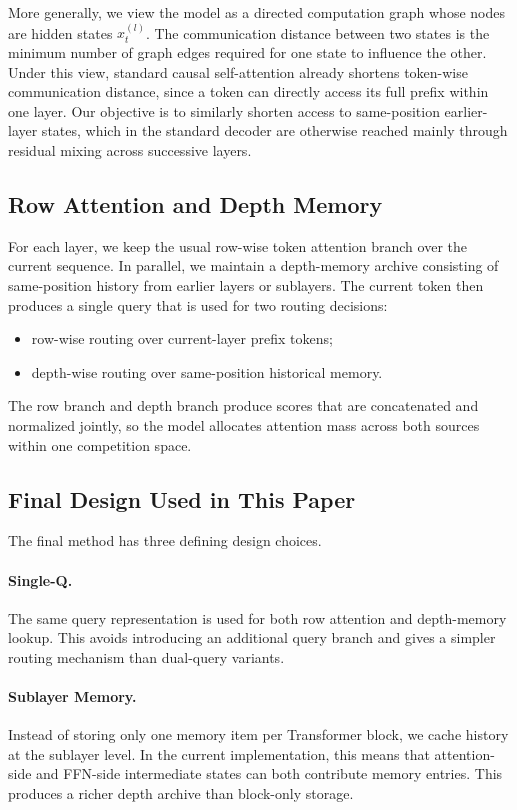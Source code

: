 \documentclass[11pt]{article}
\begin{document}
More generally, we view the model as a directed computation graph whose nodes are hidden states $x_t^{(l)}$. The communication distance between two states is the minimum number of graph edges required for one state to influence the other. Under this view, standard causal self-attention already shortens token-wise communication distance, since a token can directly access its full prefix within one layer. Our objective is to similarly shorten access to same-position earlier-layer states, which in the standard decoder are otherwise reached mainly through residual mixing across successive layers.

\subsection{Row Attention and Depth Memory}

For each layer, we keep the usual row-wise token attention branch over the current sequence. In parallel, we maintain a depth-memory archive consisting of same-position history from earlier layers or sublayers. The current token then produces a single query that is used for two routing decisions:
\begin{itemize}[leftmargin=1.5em]
    \item row-wise routing over current-layer prefix tokens;
    \item depth-wise routing over same-position historical memory.
\end{itemize}
The row branch and depth branch produce scores that are concatenated and normalized jointly, so the model allocates attention mass across both sources within one competition space.

\subsection{Final Design Used in This Paper}

The final method has three defining design choices.

\paragraph{Single-Q.}
The same query representation is used for both row attention and depth-memory lookup. This avoids introducing an additional query branch and gives a simpler routing mechanism than dual-query variants.

\paragraph{Sublayer Memory.}
Instead of storing only one memory item per Transformer block, we cache history at the sublayer level. In the current implementation, this means that attention-side and FFN-side intermediate states can both contribute memory entries. This produces a richer depth archive than block-only storage.
\end{document}
